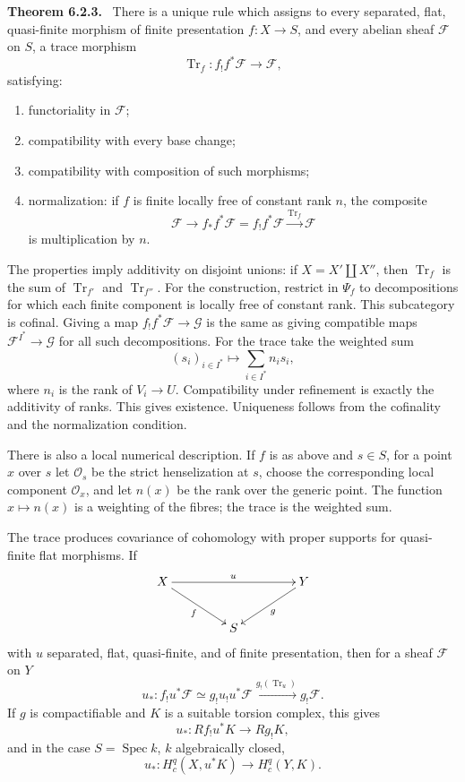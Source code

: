 \documentclass[12pt]{article}
\newcommand{\Ff}{\mathcal F}
\newcommand{\Gg}{\mathcal G}
\newcommand{\Oo}{\mathcal O}
\DeclareMathOperator{\Spec}{Spec}
\DeclareMathOperator{\Tr}{Tr}
\newenvironment{statement}[1]{\par\medskip\noindent\textbf{#1.}\ }{\par\medskip}
\begin{document}
\begin{statement}{Theorem 6.2.3}
There is a unique rule which assigns to every separated, flat, quasi-finite morphism of finite presentation \(f:X\to S\), and every abelian sheaf \(\Ff\) on \(S\), a trace morphism
\[
\Tr_f:f_!f^*\Ff\longrightarrow\Ff,
\]
satisfying:
\begin{enumerate}[label=(Var \arabic*)]
\item functoriality in \(\Ff\);
\item compatibility with every base change;
\item compatibility with composition of such morphisms;
\item normalization: if \(f\) is finite locally free of constant rank \(n\), the composite
\[
\Ff\to f_*f^*\Ff=f_!f^*\Ff\xrightarrow{\Tr_f}\Ff
\]
is multiplication by \(n\).
\end{enumerate}
\end{statement}

The properties imply additivity on disjoint unions: if \(X=X'\amalg X''\), then \(\Tr_f\) is the sum of \(\Tr_{f'}\) and \(\Tr_{f''}\). For the construction, restrict in \(\Psi_f\) to decompositions for which each finite component is locally free of constant rank. This subcategory is cofinal. Giving a map \(f_!f^*\Ff\to\Gg\) is the same as giving compatible maps \(\Ff^{I^*}\to\Gg\) for all such decompositions. For the trace take the weighted sum
\[
(s_i)_{i\in I^*}\longmapsto\sum_{i\in I^*}n_i s_i,
\]
where \(n_i\) is the rank of \(V_i\to U\). Compatibility under refinement is exactly the additivity of ranks. This gives existence. Uniqueness follows from the cofinality and the normalization condition.

There is also a local numerical description. If \(f\) is as above and \(s\in S\), for a point \(x\) over \(s\) let \(\Oo_s\) be the strict henselization at \(s\), choose the corresponding local component \(\Oo_x\), and let \(n(x)\) be the rank over the generic point. The function \(x\mapsto n(x)\) is a weighting of the fibres; the trace is the weighted sum.

The trace produces covariance of cohomology with proper supports for quasi-finite flat morphisms. If
\[
\xymatrix@C=1.5cm{X\ar[rr]^u\ar[rd]_f&&Y\ar[ld]^g\\&S&}
\]
with \(u\) separated, flat, quasi-finite, and of finite presentation, then for a sheaf \(\Ff\) on \(Y\)
\[
u_*:f_!u^*\Ff\simeq g_!u_!u^*\Ff\xrightarrow{g_!(\Tr_u)}g_!\Ff.
\]
If \(g\) is compactifiable and \(K\) is a suitable torsion complex, this gives
\[
u_*:Rf_!u^*K\longrightarrow Rg_!K,
\]
and in the case \(S=\Spec k\), \(k\) algebraically closed,
\[
u_*:H^q_c(X,u^*K)\longrightarrow H^q_c(Y,K).
\]
\end{document}
